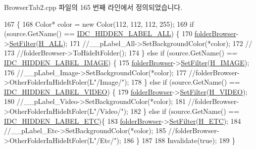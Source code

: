 Browser\+Tab2.\+cpp 파일의 165 번째 라인에서 정의되었습니다.


\begin{DoxyCode}
167                                                 \{
168     Color* color = \textcolor{keyword}{new} Color(112, 112, 112, 255);
169     \textcolor{keywordflow}{if} (source.GetName() == \hyperlink{_app_resource_id_8h_ac9397db90c4b3ebfbf6bc3e6055353c1}{IDC\_HIDDEN\_LABEL\_ALL}) \{
170         \hyperlink{class_browser_tab2_ae1cb54bfa632e894ff9bb34042e70bec}{folderBrowser}->\hyperlink{class_folder_browser_a6d543b0062fbb2b1d5de68346fcce7a5}{SetFilter}(\hyperlink{_folder_browser_8h_af547d73b85f475c4abfafdb76bf0c301aad30772cd86a5fa22262bf9c16c2eb42}{H\_ALL});
171         \textcolor{comment}{//\_\_pLabel\_All->SetBackgroundColor(*color);}
172         \textcolor{comment}{//}
173         \textcolor{comment}{//folderBrowser->ToHideItFolder();}
174     \} \textcolor{keywordflow}{else} \textcolor{keywordflow}{if} (source.GetName() == \hyperlink{_app_resource_id_8h_a4fb4fc3d07851dac24fca9b4a9e0e27c}{IDC\_HIDDEN\_LABEL\_IMAGE}) \{
175         \hyperlink{class_browser_tab2_ae1cb54bfa632e894ff9bb34042e70bec}{folderBrowser}->\hyperlink{class_folder_browser_a6d543b0062fbb2b1d5de68346fcce7a5}{SetFilter}(\hyperlink{_folder_browser_8h_af547d73b85f475c4abfafdb76bf0c301aa6be44e52b2ea1e9671482254a70dba0}{H\_IMAGE});
176         \textcolor{comment}{//\_\_pLabel\_Image->SetBackgroundColor(*color);}
177         \textcolor{comment}{//folderBrowser->OtherFolderInHideItFoler(L"/Image/");}
178     \} \textcolor{keywordflow}{else} \textcolor{keywordflow}{if} (source.GetName() == \hyperlink{_app_resource_id_8h_a5d02d110c2460802d5caa7d968cd8bbc}{IDC\_HIDDEN\_LABEL\_VIDEO}) \{
179         \hyperlink{class_browser_tab2_ae1cb54bfa632e894ff9bb34042e70bec}{folderBrowser}->\hyperlink{class_folder_browser_a6d543b0062fbb2b1d5de68346fcce7a5}{SetFilter}(\hyperlink{_folder_browser_8h_af547d73b85f475c4abfafdb76bf0c301ad8a34e0e456a91ca22a267f2f7b44651}{H\_VIDEO});
180         \textcolor{comment}{//\_\_pLabel\_Video->SetBackgroundColor(*color);}
181         \textcolor{comment}{//folderBrowser->OtherFolderInHideItFoler(L"/Video/");}
182     \} \textcolor{keywordflow}{else} \textcolor{keywordflow}{if} (source.GetName() == \hyperlink{_app_resource_id_8h_a6929d8bb1b458e959416cee5c79d316c}{IDC\_HIDDEN\_LABEL\_ETC})\{
183         \hyperlink{class_browser_tab2_ae1cb54bfa632e894ff9bb34042e70bec}{folderBrowser}->\hyperlink{class_folder_browser_a6d543b0062fbb2b1d5de68346fcce7a5}{SetFilter}(\hyperlink{_folder_browser_8h_af547d73b85f475c4abfafdb76bf0c301a29999a14bbcc6a2c7eac4af5f0383c9b}{H\_ETC});
184         \textcolor{comment}{//\_\_pLabel\_Etc->SetBackgroundColor(*color);}
185         \textcolor{comment}{//folderBrowser->OtherFolderInHideItFoler(L"/Etc/");}
186     \}
187 
188     Invalidate(\textcolor{keyword}{true});
189 \}
\end{DoxyCode}


